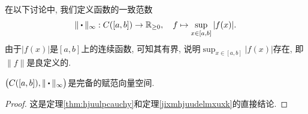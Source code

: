 在以下讨论中, 我们定义函数的一致范数$$\| \bigcdot \|_{\infty} : C([a,b]) \to \R _{\geq 0}, \quad f \mapsto \sup_{x \in [a,b]}|f(x)|. $$
由于$|f(x)|$是$[a,b]$上的连续函数, 可知其有界, 说明$\sup_{x \in [a,b]}|f(x)|$存在, 即$\| f \|$是良定义的. 

\begin{theorem}{}
	$\big( C([a,b]),\| \bigcdot \|_{\infty} \big)$是完备的赋范向量空间. 
\end{theorem}
\begin{proof}
	这是定理\ref{thm:hjuulpcauchy}和定理\ref{jixmhjuudelmxuxk}的直接结论. 
\end{proof}


























